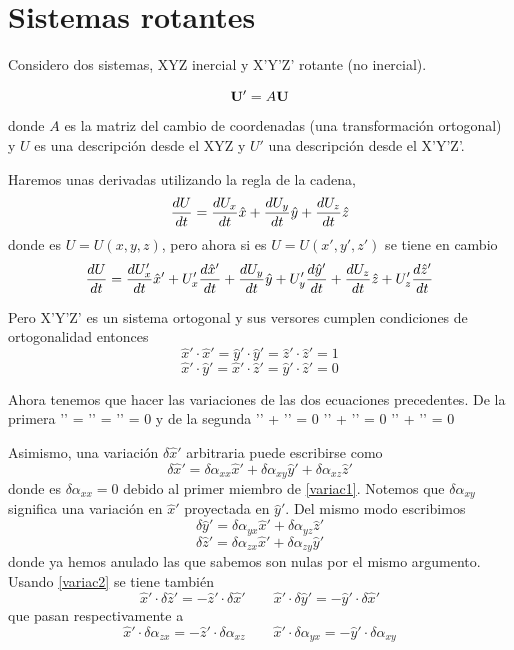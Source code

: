 \documentclass[10pt,oneside]{CBFT_book}
\begin{document}
\section{Sistemas rotantes}

Considero dos sistemas, XYZ inercial y X'Y'Z' rotante (no inercial).

\[
	\vb{U}' = A \vb{U} 
\]
donde $A$ es la matriz del cambio de coordenadas (una transformación ortogonal) y $U$ es una descripción
desde el XYZ y $U'$ una descripción desde el X'Y'Z'.

Haremos unas derivadas utilizando la regla de la cadena,
\[
	\frac{d^{\hspace{-0.05em}} {U}}{d {t}^{\hspace{-0.05em}}} = \frac{d^{\hspace{-0.05em}} {U_x}}{d {t}^{\hspace{-0.05em}}}\hat{x} + \frac{d^{\hspace{-0.05em}} {U_y}}{d {t}^{\hspace{-0.05em}}}\hat{y} + \frac{d^{\hspace{-0.05em}} {U_z}}{d {t}^{\hspace{-0.05em}}}\hat{z} 
\]
donde es $U = U(x,y,z)$, pero ahora si es $U = U(x',y',z')$ se tiene en cambio
\[
	\frac{d^{\hspace{-0.05em}} {U}}{d {t}^{\hspace{-0.05em}}} = \frac{d^{\hspace{-0.05em}} {U_x'}}{d {t}^{\hspace{-0.05em}}}\hat{x}' + U_x' \frac{d^{\hspace{-0.05em}} {\hat{x}'}}{d {t}^{\hspace{-0.05em}}} + 
	\frac{d^{\hspace{-0.05em}} {U_y}}{d {t}^{\hspace{-0.05em}}}\hat{y} + U_y' \frac{d^{\hspace{-0.05em}} {\hat{y}'}}{d {t}^{\hspace{-0.05em}}} + \frac{d^{\hspace{-0.05em}} {U_z}}{d {t}^{\hspace{-0.05em}}}\hat{z} + U_z' \frac{d^{\hspace{-0.05em}} {\hat{z}'}}{d {t}^{\hspace{-0.05em}}}
\]

Pero X'Y'Z' es un sistema ortogonal y sus versores cumplen condiciones de ortogonalidad entonces
\[
	\hat{x}'\cdot\hat{x}' = \hat{y}'\cdot\hat{y}' = \hat{z}'\cdot\hat{z}' = 1
\]
\[
	\hat{x}'\cdot\hat{y}' = \hat{x}'\cdot\hat{z}' = \hat{y}'\cdot\hat{z}' = 0
\]

Ahora tenemos que hacer las variaciones de las dos ecuaciones precedentes. De la primera
\be
	 '\cdot\delta{}' = '\cdot\delta{}' = '\cdot\delta{}' = 0
\label{variac1}	 
\ee
y de la segunda
\be
	'\cdot\delta{}' + '\cdot\delta{}' = 0 \qquad \qquad 
	'\cdot\delta{}' + '\cdot\delta{}' = 0 \qquad \qquad 
	'\cdot\delta{}' + '\cdot\delta{}' = 0 \qquad \qquad 
\label{variac2}	
\ee

Asimismo, una variación $\delta\hat{x}'$ arbitraria puede escribirse como
\[
	\delta\hat{x}' = \delta \alpha_{xx}\hat{x}' + \delta \alpha_{xy}\hat{y}' + \delta \alpha_{xz}\hat{z}' 
\]
donde es $\delta \alpha_{xx}=0$ debido al primer miembro de \eqref{variac1}. Notemos que $\delta \alpha_{xy}$ significa
una variación en $\hat{x}'$ proyectada en $\hat{y}'$. Del mismo modo escribimos
\[
	\delta\hat{y}' = \delta \alpha_{yx}\hat{x}' + \delta \alpha_{yz}\hat{z}' 
\]
\[
	\delta\hat{z}' = \delta \alpha_{zx}\hat{x}' + \delta \alpha_{zy}\hat{y}' 
\]
donde ya hemos anulado las que sabemos son nulas por el mismo argumento. Usando \eqref{variac2} se tiene también
\[
	\hat{x}'\cdot\delta\hat{z}' =  - \hat{z}'\cdot\delta\hat{x}' \qquad 
	\hat{x}'\cdot\delta\hat{y}' =  - \hat{y}'\cdot\delta\hat{x}'
\]
que pasan respectivamente a
\[
	\hat{x}'\cdot\delta\alpha_{zx} =  - \hat{z}'\cdot\delta\alpha_{xz} \qquad 
	\hat{x}'\cdot\delta\alpha_{yx} =  - \hat{y}'\cdot\delta\alpha_{xy}
\]
\end{document}
